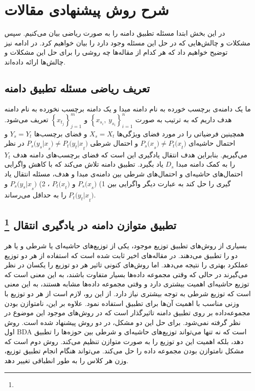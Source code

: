 \section{شرح روش پیشنهادی مقالات}
{ 	
	در این بخش ابتدا مسئله تطبیق دامنه را به صورت ریاضی بیان می‌کنیم. سپس مشکلات و چالش‌هایی که در حل این مسئله وجود دارد را بیان خواهیم کرد. در ادامه نیز توضیح خواهیم داد که هر کدام از مقاله‌ها چه روشی را برای حل این مشکلات و چالش‌ها ارائه داده‌اند.
	
	\subsection{تعریف ریاضی مسئله تطبیق دامنه}
	{
		ما یک دامنه‌ی برچسب خورده به نام دامنه مبدا و یک دامنه برچسب نخورده به نام دامنه هدف داریم که به ترتیب به  صورت 
		$\left\{x_{s_i},\ y_{s_i}\right\}_{i=1} ^ n $
		و 
		$\left\{x_{t_j}\right\}_{j=1} ^ m$
		تعریف می‌شود. همچینین فرضیاتی را در مورد فضای ویژگی‌ها
		$X_s = X_t$
		و فضای برچسب‌ها
		$Y_s=Y_t$
		و احتمال حاشیه‌ای  
		${P_s(x}_s)\neq{P_t(x}_t)$
		و احتمال شرطی
		${P_s(y_s|x}_s)\neq{P_t(y_t|x}_t)$
		در نظر می‌گیریم. بنابراین هدف انتقال یادگیری این است که فضای برچسب‌های دامنه هدف 
		$Y_t$
		را به کمک دامنه مبدا
		$D_s$
		یاد بگیرد. تطبیق دامنه تلاش می‌کند که با کاهش واگرایی احتمال‌های حاشیه‌ای و احتمال‌های شرطی  بین دامنه‌ی مبدا و هدف، مسئله انتقال یاد گیری را حل کند به عبارت دیگر واگرایی بین 1)
		${P_s(x}_s)$
		و 
		${P_t(x}_t)$
		، 2) 
		${P_s(y_s|x}_s)$
		و
		${P_t(y_t|x}_t)$
		را به حداقل می‌رساند.
	}

	\subsection{تطبیق  متوازن دامنه در یادگیری انتقال
		\protect \footnote{}}
	{
		بسیاری از روش‌های تطبیق توزیع موجود، یکی از توزیع‌های حاشیه‌ای یا شرطی و یا هر دو را تطبیق می‌دهند. در مقاله‌های اخیر ثابت شده است که استفاده از هر دو توزیع عملکرد بهتری را نتیجه می‌دهد. اما روش‌های کنونی تاثیر هر دو توزیع را یکسان در نظر می‌گیرند در حالی که وقتی مجموعه داده‌ها بسیار متفاوت باشند، به این معنی است که توزیع حاشیه‌ای اهمیت بیشتری دارد و وقتی مجموعه داده‌ها مشابه هستند، به این معنی است که توزیع شرطی به توجه بیشتری نیاز دارد. از این رو، لازم است از هر دو توزیع با وزنی مناسب با اهمیت آن‌ها برای تطبیق استفاده نمود. علاوه بر این، نامتوازن بودن مجموعه‌داده بر روی تطبیق دامنه تاثیرگذار است که در روش‌های موجود این موضوع در نظر گرفته نمی‌شود. برای حل این دو مشکل، در
		\cite{wang2017balanced}
		دو روش پیشنهاد شده است. روش اول BDA است که نه تنها می‌تواند توزیع‌های حاشیه‌ای و شرطی بین حوزه‌ها را تطبیق دهد، بلکه اهمیت این دو توزیع را به صورت متوازن تنظیم می‌کند. روش دوم
		است که مشکل نامتوازن بودن مجموعه داده را حل می‌کند.
		می‌تواند هنگام انجام تطبیق توزیع، وزن هر کلاس را به طور انطباقی تغییر دهد.
}}
